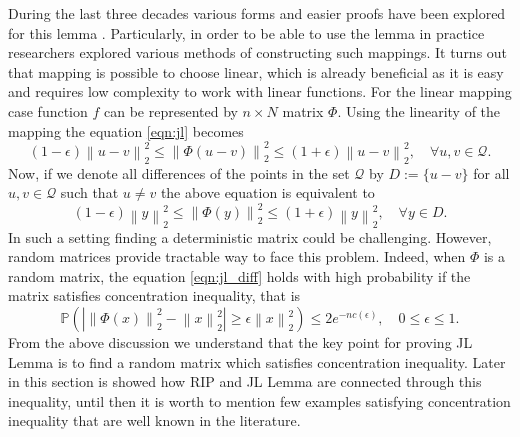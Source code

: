 \documentclass[twoside,11pt]{article}
\newcommand\norm[1]{\left\lVert#1\right\rVert}
\newcommand*\by{{\times}}
\begin{document}
During the last three decades various forms and easier proofs have been explored for this lemma \citep{jl1, jl2, jl3}. Particularly, in order to be able to use the lemma in practice researchers explored various methods of constructing such mappings. It turns out that mapping is possible to choose linear, which is already beneficial as it is easy and requires low complexity to work with linear functions. For the linear mapping case function $f$ can be represented by $n \by N$ matrix $\Phi$. Using the linearity of the mapping the equation \ref{eqn:jl} becomes
$$
(1 - \epsilon) \norm{u - v}_2^2 \leq \norm{\Phi(u-v)}_2^2 \leq (1 + \epsilon) \norm{u - v}_2^2, \quad \forall u, v \in \mathcal{Q}.
$$
Now, if we denote all differences of the points in the set $\mathcal{Q}$ by $D := \{u-v\}$ for all $u,v \in \mathcal{Q}$ such that $u \not = v$ the above equation is equivalent to 
\begin{equation}
\label{eqn:jl_diff}    
(1 - \epsilon) \norm{y}_2^2 \leq \norm{\Phi(y)}_2^2 \leq (1 + \epsilon) \norm{y}_2^2, \quad \forall y \in D.
\end{equation}
In such a setting finding a deterministic matrix could be challenging. However, random matrices provide tractable way to face this problem. Indeed, when $\Phi$ is a random matrix, the equation \ref{eqn:jl_diff} holds with high probability if the matrix satisfies concentration inequality, that is
$$
\mathbb{P}(|\norm{\Phi(x)}_2^2 - \norm{x}_2^2| \geq \epsilon\norm{x}_2^2) \leq 2e^{-nc(\epsilon)}, \quad 0 \le \epsilon \le 1. 
$$
From the above discussion we understand that the key point for proving JL Lemma is to find a random matrix which satisfies concentration inequality. Later in this section is showed how RIP and JL Lemma are connected through this inequality, until then it is worth to mention few examples satisfying concentration inequality that are well known in the literature.
\end{document}
